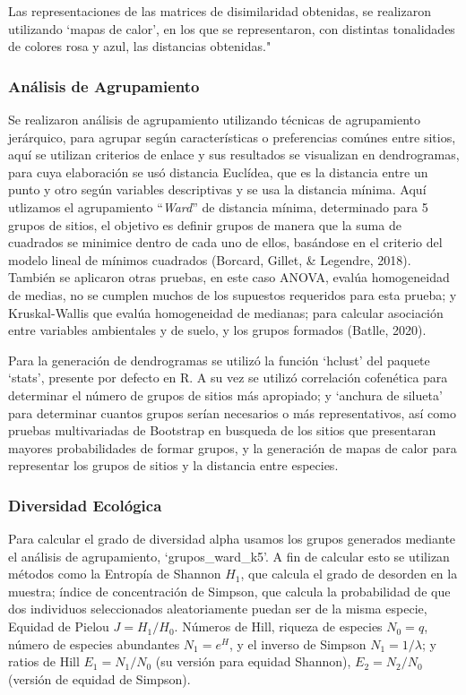 \documentclass[11pt,]{article}
\begin{document}
Las representaciones de las matrices de disimilaridad obtenidas, se
realizaron utilizando `mapas de calor', en los que se representaron, con
distintas tonalidades de colores rosa y azul, las distancias obtenidas."

\subsubsection{Análisis de
Agrupamiento}\label{anuxe1lisis-de-agrupamiento}

Se realizaron análisis de agrupamiento utilizando técnicas de
agrupamiento jerárquico, para agrupar según características o
preferencias comúnes entre sitios, aquí se utilizan criterios de enlace
y sus resultados se visualizan en dendrogramas, para cuya elaboración se
usó distancia Euclídea, que es la distancia entre un punto y otro según
variables descriptivas y se usa la distancia mínima. Aquí utlizamos el
agrupamiento ``\emph{Ward}'' de distancia mínima, determinado para 5
grupos de sitios, el objetivo es definir grupos de manera que la suma de
cuadrados se minimice dentro de cada uno de ellos, basándose en el
criterio del modelo lineal de mínimos cuadrados (Borcard, Gillet, \&
Legendre, 2018). También se aplicaron otras pruebas, en este caso ANOVA,
evalúa homogeneidad de medias, no se cumplen muchos de los supuestos
requeridos para esta prueba; y Kruskal-Wallis que evalúa homogeneidad de
medianas; para calcular asociación entre variables ambientales y de
suelo, y los grupos formados (Batlle, 2020).

Para la generación de dendrogramas se utilizó la función `hclust' del
paquete `stats', presente por defecto en R. A su vez se utilizó
correlación cofenética para determinar el número de grupos de sitios más
apropiado; y `anchura de silueta' para determinar cuantos grupos serían
necesarios o más representativos, así como pruebas multivariadas de
Bootstrap en busqueda de los sitios que presentaran mayores
probabilidades de formar grupos, y la generación de mapas de calor para
representar los grupos de sitios y la distancia entre especies.

\subsubsection{Diversidad Ecológica}\label{diversidad-ecoluxf3gica}

Para calcular el grado de diversidad alpha usamos los grupos generados
mediante el análisis de agrupamiento, `grupos\_ward\_k5'. A fin de
calcular esto se utilizan métodos como la Entropía de Shannon \(H_1\),
que calcula el grado de desorden en la muestra; índice de concentración
de Simpson, que calcula la probabilidad de que dos individuos
seleccionados aleatoriamente puedan ser de la misma especie, Equidad de
Pielou \(J=H_1/H_0\). Números de Hill, riqueza de especies \(N_0=q\),
número de especies abundantes \(N_1=e^H\), y el inverso de Simpson
\(N_1=1/\lambda\); y ratios de Hill \(E_1=N_1/N_0\) (su versión para
equidad Shannon), \(E_2=N_2/N_0\) (versión de equidad de Simpson).
\end{document}
